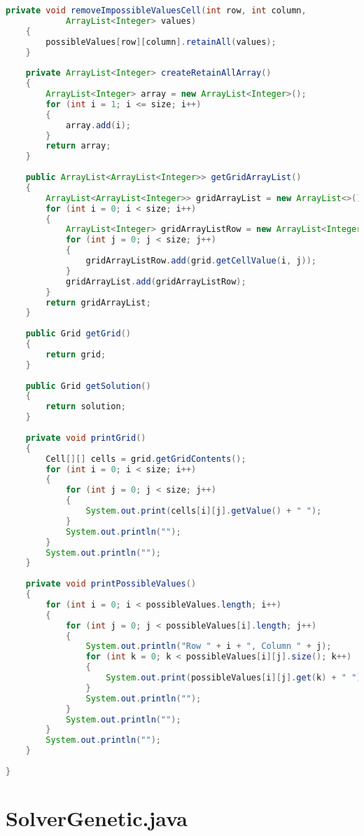 \begin{lstlisting}[language=Java,basicstyle=\tiny,caption=SolverRuleBased.java]
    private void removeImpossibleValuesCell(int row, int column, 
            ArrayList<Integer> values)
    {
        possibleValues[row][column].retainAll(values);
    }
    
    private ArrayList<Integer> createRetainAllArray()
    {
        ArrayList<Integer> array = new ArrayList<Integer>();
        for (int i = 1; i <= size; i++)
        {
            array.add(i);
        }
        return array;
    }
    
    public ArrayList<ArrayList<Integer>> getGridArrayList()
    {
        ArrayList<ArrayList<Integer>> gridArrayList = new ArrayList<>();
        for (int i = 0; i < size; i++)
        {
            ArrayList<Integer> gridArrayListRow = new ArrayList<Integer>();
            for (int j = 0; j < size; j++)
            {
                gridArrayListRow.add(grid.getCellValue(i, j));
            }
            gridArrayList.add(gridArrayListRow);
        }
        return gridArrayList;
    }
    
    public Grid getGrid()
    {
        return grid;
    }
    
    public Grid getSolution()
    {
        return solution;
    }
    
    private void printGrid()
    {
        Cell[][] cells = grid.getGridContents();
        for (int i = 0; i < size; i++)
        {
            for (int j = 0; j < size; j++)
            {
                System.out.print(cells[i][j].getValue() + " ");
            }
            System.out.println("");
        }
        System.out.println("");
    }
    
    private void printPossibleValues()
    {
        for (int i = 0; i < possibleValues.length; i++)
        {
            for (int j = 0; j < possibleValues[i].length; j++)
            {
                System.out.println("Row " + i + ", Column " + j);
                for (int k = 0; k < possibleValues[i][j].size(); k++)
                {
                    System.out.print(possibleValues[i][j].get(k) + " ");
                }
                System.out.println("");
            }
            System.out.println("");
        }
        System.out.println("");
    }
    
}
\end{lstlisting}

\section{SolverGenetic.java}
\label{sec:kodeprogramgenetic}

